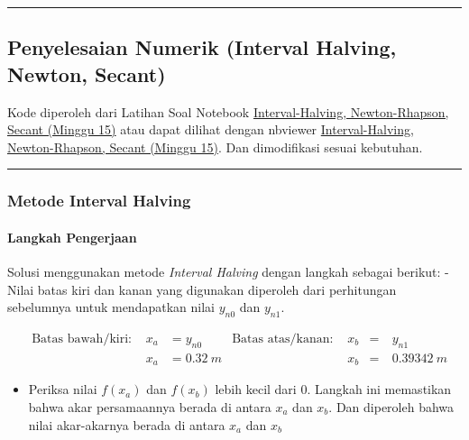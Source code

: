 \documentclass[11pt]{article}
\providecommand{\tightlist}{%
      \setlength{\itemsep}{0pt}\setlength{\parskip}{0pt}}
\begin{document}
    \begin{center}\rule{0.5\linewidth}{\linethickness}\end{center}

\subsection{Penyelesaian Numerik (Interval Halving, Newton,
Secant)}\label{penyelesaian-numerik-interval-halving-newton-secant}

Kode diperoleh dari Latihan Soal Notebook
\href{https://github.com/taruma/belajar-tsa/blob/master/ansis/Interval-Halving\%2C\%20Newton-Rhapson\%2C\%20Secant\%20(Minggu\%2015).ipynb}{Interval-Halving,
Newton-Rhapson, Secant (Minggu 15)} atau dapat dilihat dengan nbviewer
\href{https://nbviewer.jupyter.org/github/taruma/belajar-tsa/blob/master/ansis/Interval-Halving\%2C\%20Newton-Rhapson\%2C\%20Secant\%20\%28Minggu\%2015\%29.ipynb}{Interval-Halving,
Newton-Rhapson, Secant (Minggu 15)}. Dan dimodifikasi sesuai kebutuhan.

\begin{center}\rule{0.5\linewidth}{\linethickness}\end{center}

\subsubsection{Metode Interval Halving}\label{metode-interval-halving}

\paragraph{Langkah Pengerjaan}\label{langkah-pengerjaan}

Solusi menggunakan metode \emph{Interval Halving} dengan langkah sebagai
berikut: - Nilai batas kiri dan kanan yang digunakan diperoleh dari
perhitungan sebelumnya untuk mendapatkan nilai \(y_{n0}\) dan
\(y_{n1}\).

\[\begin{aligned} &\text{Batas bawah/kiri: }& x_a &= y_{n0} &\text{Batas atas/kanan: }& x_b &=&\ y_{n1} \\
&& x_a &= 0.32\ m && x_b &=&\ 0.39342\ m \end{aligned}\]

\begin{itemize}
\tightlist
\item
  Periksa nilai \(f(x_a)\) dan \(f(x_b)\) lebih kecil dari \(0\).
  Langkah ini memastikan bahwa akar persamaannya berada di antara
  \(x_a\) dan \(x_b\). Dan diperoleh bahwa nilai akar-akarnya berada di
  antara \(x_a\) dan \(x_b\)
\end{itemize}
\end{document}
